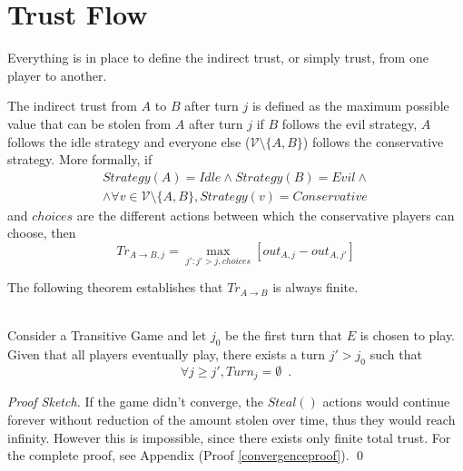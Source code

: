 \documentclass[11pt]{llncs}
\theoremstyle{definition}
\newenvironment{proofsketch}{\textit{Proof Sketch.}}{\qed \bigskip \ \\}
\begin{document}
  \section{Trust Flow}
    Everything is in place to define the indirect trust, or simply trust, from one player to another.
    \begin{definition}
       The indirect trust from $A$ to $B$ after turn $j$ is defined as the maximum possible value that can be stolen from
       $A$ after turn $j$ if $B$ follows the evil strategy, $A$ follows the idle strategy and everyone else ($\mathcal{V}
       \setminus \{A,B\}$) follows the conservative strategy. More formally, if
       \begin{equation}
       \begin{gathered}
          Strategy\left(A\right) = Idle \wedge Strategy\left(B\right) = Evil \wedge \\
          \wedge \forall v \in \mathcal{V} \setminus \{A,B\}, Strategy\left(v\right) = Conservative
       \end{gathered}
       \end{equation}
       and $choices$ are the different actions between which the conservative players can choose, then
       \begin{equation}
          Tr_{A \rightarrow B, j} = \max\limits_{j' : j' > j, choices}{\left[out_{A,j} - out_{A,j'}\right]}
       \end{equation}
    \end{definition}
    The following theorem establishes that $Tr_{A \rightarrow B}$ is always finite.
    \begin{theorem} \ \\
       \label{convergence}
       Consider a Transitive Game and let $j_0$ be the first turn that $E$ is chosen to play. Given that all players
       eventually play, there exists a turn $j' > j_0$ such that
       \begin{equation}
          \forall j \geq j', Turn_j = \emptyset \enspace.
       \end{equation}
    \end{theorem}
    \begin{proofsketch}
       If the game didn't converge, the $Steal\left(\right)$ actions would continue forever without reduction of the amount
       stolen over time, thus they would reach infinity. However this is impossible, since there exists only finite total
       trust. For the complete proof, see Appendix (Proof \ref{convergenceproof}).
    \end{proofsketch}
\end{document}
